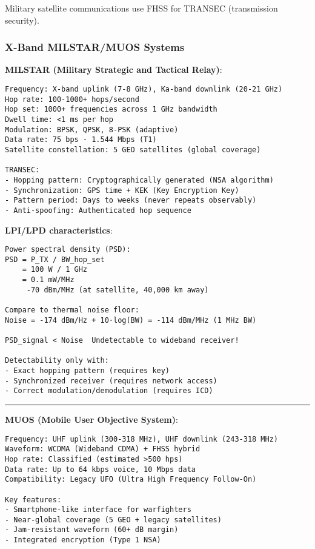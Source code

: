 Military satellite communications use FHSS for TRANSEC (transmission
security).

\subsubsection{X-Band MILSTAR/MUOS
Systems}\label{x-band-milstarmuos-systems}

\textbf{MILSTAR (Military Strategic and Tactical Relay)}:

\begin{verbatim}
Frequency: X-band uplink (7-8 GHz), Ka-band downlink (20-21 GHz)
Hop rate: 100-1000+ hops/second
Hop set: 1000+ frequencies across 1 GHz bandwidth
Dwell time: <1 ms per hop
Modulation: BPSK, QPSK, 8-PSK (adaptive)
Data rate: 75 bps - 1.544 Mbps (T1)
Satellite constellation: 5 GEO satellites (global coverage)

TRANSEC:
- Hopping pattern: Cryptographically generated (NSA algorithm)
- Synchronization: GPS time + KEK (Key Encryption Key)
- Pattern period: Days to weeks (never repeats observably)
- Anti-spoofing: Authenticated hop sequence
\end{verbatim}

\textbf{LPI/LPD characteristics}:

\begin{verbatim}
Power spectral density (PSD):
PSD = P_TX / BW_hop_set
    = 100 W / 1 GHz
    = 0.1 mW/MHz
     -70 dBm/MHz (at satellite, 40,000 km away)

Compare to thermal noise floor:
Noise = -174 dBm/Hz + 10·log(BW) = -114 dBm/MHz (1 MHz BW)

PSD_signal < Noise  Undetectable to wideband receiver!

Detectability only with:
- Exact hopping pattern (requires key)
- Synchronized receiver (requires network access)
- Correct modulation/demodulation (requires ICD)
\end{verbatim}

\begin{center}\rule{0.5\linewidth}{0.5pt}\end{center}

\textbf{MUOS (Mobile User Objective System)}:

\begin{verbatim}
Frequency: UHF uplink (300-318 MHz), UHF downlink (243-318 MHz)
Waveform: WCDMA (Wideband CDMA) + FHSS hybrid
Hop rate: Classified (estimated >500 hps)
Data rate: Up to 64 kbps voice, 10 Mbps data
Compatibility: Legacy UFO (Ultra High Frequency Follow-On)

Key features:
- Smartphone-like interface for warfighters
- Near-global coverage (5 GEO + legacy satellites)
- Jam-resistant waveform (60+ dB margin)
- Integrated encryption (Type 1 NSA)
\end{verbatim}

